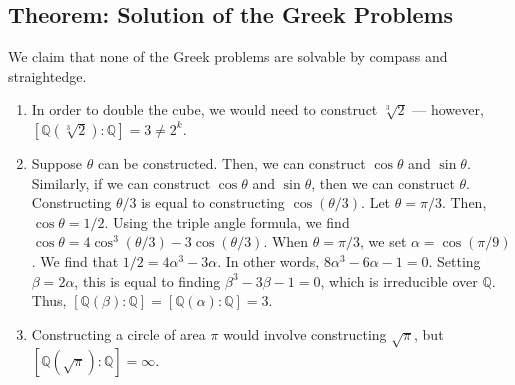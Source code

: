 \documentclass[10pt]{extarticle}
\newcommand{\Q}{\mathbb{Q}}
\begin{document}
  \subsection{Theorem: Solution of the Greek Problems}%
  We claim that none of the Greek problems are solvable by compass and straightedge.
  \begin{enumerate}[(1)]
    \item In order to double the cube, we would need to construct $\sqrt[3]{2}$ --- however, $[\Q(\sqrt[3]{2}):\Q] = 3 \neq 2^{k}$.
    \item Suppose $\theta$ can be constructed. Then, we can construct $\cos\theta$ and $\sin\theta$. Similarly, if we can construct $\cos\theta$ and $\sin\theta$, then we can construct $\theta$. Constructing $\theta/3$ is equal to constructing $\cos(\theta/3)$. Let $\theta = \pi/3$. Then, $\cos\theta = 1/2$. Using the triple angle formula, we find $\cos\theta = 4\cos^3(\theta/3) - 3\cos(\theta/3)$. When $\theta = \pi/3$, we set $\alpha = \cos(\pi/9)$. We find that $1/2 = 4\alpha^3 - 3\alpha$. In other words, $8\alpha^3 - 6\alpha - 1 = 0$. Setting $\beta = 2\alpha$, this is equal to finding $\beta^3 - 3\beta - 1 = 0$, which is irreducible over $\Q$. Thus, $[\Q(\beta):\Q] = [\Q(\alpha):\Q] = 3$.
    \item Constructing a circle of area $\pi$ would involve constructing $\sqrt{\pi}$, but $[\Q(\sqrt{\pi}):\Q] = \infty$.
  \end{enumerate}
\end{document}
